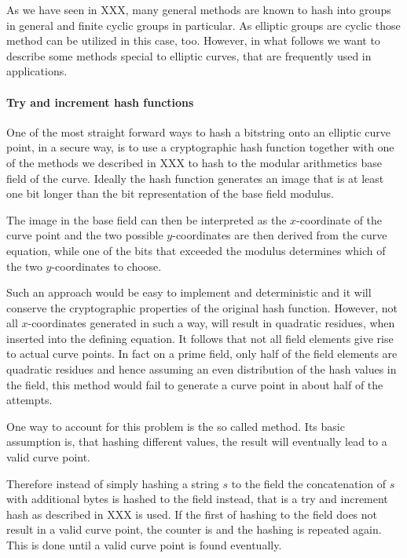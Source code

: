 As we have seen in XXX, many general methods are known to hash into groups in general and finite cyclic groups in particular. As elliptic groups are cyclic those method can be utilized in this case, too. However, in what follows we want to describe some methods special to elliptic curves, that are frequently used in applications. 
\paragraph{Try and increment hash functions}
One of the most straight forward ways to hash a bitstring onto an elliptic curve point, in a  secure way, is to use a cryptographic hash function together with one of the methods we described in XXX to hash to the modular arithmetics base field of the curve. Ideally the hash function generates an image that is at least one bit longer than the bit representation of the base field modulus.

The image in the base field can then be interpreted as the $x$-coordinate of the curve point and the two possible $y$-coordinates are then derived from the curve equation, while one of the bits that exceeded the modulus determines which of the two $y$-coordinates to choose.

Such an approach would be easy to implement and deterministic and it will conserve the cryptographic properties of the original hash function. However, not all $x$-coordinates generated in such a way, will result in quadratic residues, when inserted into the defining equation. It follows that not all field elements give rise to actual curve points. In fact
on a prime field, only half of the field elements are quadratic residues and hence assuming an even distribution of the hash values in the field, this method would fail to generate a curve point in about half of the attempts. 

One way to account for this problem is the so called  method. Its basic assumption is, that hashing different values, the result will eventually lead to a valid curve point. 

Therefore instead of simply hashing a string $s$ to the field the concatenation of $s$ with additional bytes is hashed to the field instead, that is a try and increment hash as described in XXX is used. If the first  of hashing to the field does not result in a valid curve point, the counter is  and the hashing is repeated again. This is done until a valid curve point is found eventually.

